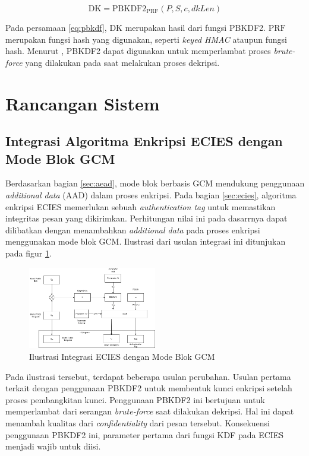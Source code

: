 \documentclass[conference]{IEEEtran}
\begin{document}
\begin{equation}
    \label{eq:pbkdf}
    \text{DK} = \text{PBKDF2}_{\text{PRF}}(P, S, c, dkLen) 
\end{equation}

Pada persamaan \ref{eq:pbkdf}, $\text{DK}$ merupakan hasil dari fungsi PBKDF2. $\text{PRF}$ merupakan fungsi hash yang digunakan, seperti \emph{keyed HMAC} ataupun fungsi hash. Menurut \cite{raeburn2005}, PBKDF2 dapat digunakan untuk memperlambat proses \emph{brute-force} yang dilakukan pada saat melakukan proses dekripsi. 

\section{Rancangan Sistem}
\subsection{Integrasi Algoritma Enkripsi ECIES dengan Mode Blok GCM}

Berdasarkan bagian \ref{sec:aead}, mode blok berbasis GCM mendukung penggunaan \emph{additional data} (AAD) dalam proses enkripsi. Pada bagian \ref{sec:ecies}, algoritma enkripsi ECIES memerlukan sebuah \emph{authentication tag} untuk memastikan integritas pesan yang dikirimkan. Perhitungan nilai ini pada dasarrnya dapat dilibatkan dengan menambahkan \emph{additional data} pada proses enkripsi menggunakan mode blok GCM. Ilustrasi dari usulan integrasi ini ditunjukan pada figur \ref{fig:integrasi}.

\begin{figure}[htbp]
    \centerline{\includegraphics[width=0.5\textwidth]{res/ecies-aead.png}}
    \caption{Ilustrasi Integrasi ECIES dengan Mode Blok GCM}
    \label{fig:integrasi}
\end{figure}

Pada ilustrasi tersebut, terdapat beberapa usulan perubahan. Usulan pertama terkait dengan penggunaan PBKDF2 untuk membentuk kunci enkripsi setelah proses pembangkitan kunci. Penggunaan PBKDF2 ini bertujuan untuk memperlambat dari serangan \emph{brute-force} saat dilakukan dekripsi. Hal ini dapat menambah kualitas dari \emph{confidentiality} dari pesan tersebut. Konsekuensi penggunaan PBKDF2 ini, parameter pertama dari fungsi KDF pada ECIES menjadi wajib untuk diisi.
\end{document}
